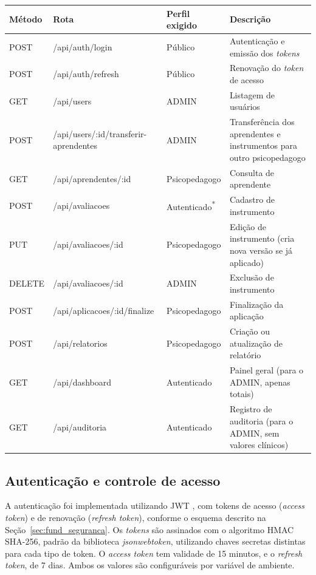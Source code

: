 \begin{quadro}[H]
\centering
\footnotesize
\caption{Seleção de rotas da API REST e perfil exigido}
\begin{tabular}{|p{1.4cm}|p{5.6cm}|p{2.4cm}|p{4.8cm}|}
\hline
\textbf{Método} & \textbf{Rota} & \textbf{Perfil exigido} & \textbf{Descrição} \\ \hline
POST & /api/auth/login & Público & Autenticação e emissão dos \textit{tokens} \\ \hline
POST & /api/auth/refresh & Público & Renovação do \textit{token} de acesso \\ \hline
GET & /api/users & ADMIN & Listagem de usuários \\ \hline
POST & /api/users/:id/transferir-aprendentes & ADMIN & Transferência dos aprendentes e instrumentos para outro psicopedagogo \\ \hline
GET & /api/aprendentes/:id & Psicopedagogo & Consulta de aprendente \\ \hline
POST & /api/avaliacoes & Autenticado\textsuperscript{*} & Cadastro de instrumento \\ \hline
PUT & /api/avaliacoes/:id & Psicopedagogo & Edição de instrumento (cria nova versão se já aplicado) \\ \hline
DELETE & /api/avaliacoes/:id & ADMIN & Exclusão de instrumento \\ \hline
POST & /api/aplicacoes/:id/finalize & Psicopedagogo & Finalização da aplicação \\ \hline
POST & /api/relatorios & Psicopedagogo & Criação ou atualização de relatório \\ \hline
GET & /api/dashboard & Autenticado & Painel geral (para o ADMIN, apenas totais) \\ \hline
GET & /api/auditoria & Autenticado & Registro de auditoria (para o ADMIN, sem valores clínicos) \\ \hline
\end{tabular}
\label{qua:rotas_api}
\end{quadro}

\subsection{Autenticação e controle de acesso}

A autenticação foi implementada utilizando JWT \cite{rfc7519_jwt}, com tokens de acesso (\textit{access token}) e de renovação (\textit{refresh token}), conforme o esquema descrito na Seção~\ref{sec:fund_seguranca}. Os \textit{tokens} são assinados com o algoritmo HMAC SHA-256, padrão da biblioteca \textit{jsonwebtoken}, utilizando chaves secretas distintas para cada tipo de token. O \textit{access token} tem validade de 15 minutos, e o \textit{refresh token}, de 7 dias. Ambos os valores são configuráveis por variável de ambiente.

